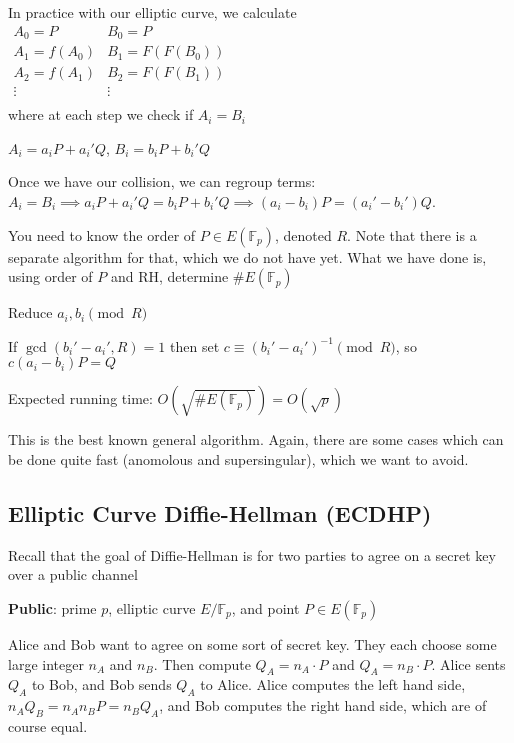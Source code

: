 \documentclass[twoside, 10pt]{article}
\newcommand{\F}{\mathbb{F}}
\begin{document}
In practice with our elliptic curve, we calculate\\
$\begin{matrix}
    A_0 = P & B_0 = P\\
    A_1 = f(A_0) & B_1 = F(F(B_0))\\
    A_2 = f(A_1) & B_2 = F(F(B_1))\\
    \vdots & \vdots\\
\end{matrix}$\\
where at each step we check if $A_i = B_i$

\begin{rmk}
    $A_i = a_i P + a_i'Q$, $B_i = b_iP + b_i'Q$
\end{rmk}

Once we have our collision, we can regroup terms: $A_i = B_i \implies a_i P + a_i'Q = b_iP + b_i'Q \implies (a_i - b_i)P = (a_i' - b_i')Q$.

\begin{rmk}
    You need to know the order of $P \in E(\F_p)$, denoted $R$. Note that there is a separate algorithm for that, which we do not have yet. What we have done is, using order of $P$ and RH, determine $\#E(\F_p)$
\end{rmk}

Reduce $a_i, b_i \pmod{R}$

If $\gcd(b_i' -a_i', R) = 1$ then set $c \equiv (b_i' - a_i')^{-1}\pmod{R}$, so $c(a_i-b_i)P = Q$

Expected running time: $O(\sqrt{\# E(\F_p)}) = O(\sqrt{p})$

\begin{rmk}
    This is the best known general algorithm. Again, there are some cases which can be done quite fast (anomolous and supersingular), which we want to avoid.
\end{rmk}

\subsection{Elliptic Curve Diffie-Hellman (ECDHP)} Recall that the goal of Diffie-Hellman is for two parties to agree on a secret key over a public channel

\textbf{Public}: prime $p$, elliptic curve $E/\F_p$, and point $P \in E(\F_p)$

Alice and Bob want to agree on some sort of secret key. They each choose some large integer $n_A$ and $n_B$. Then compute $Q_A = n_A \cdot P$ and $Q_A = n_B \cdot P$. Alice sents $Q_A$ to Bob, and Bob sends $Q_A$ to Alice. Alice computes the left hand side, $n_AQ_B = n_An_BP = n_BQ_A$, and Bob computes the right hand side, which are of course equal.
\end{document}
